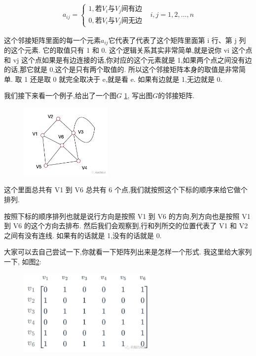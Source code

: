 \begin{align*}
a_{ij}=\begin{cases}1, \mbox{若}V_i\mbox{与}V_j\mbox{间有边} \\ 0, \mbox{若}V_i\mbox{与}V_j\mbox{间无边} \end{cases}
& i,j = 1, 2, ..., n
\end{align*}

这个邻接矩阵里面的每一个元素$a_{ij}$它代表了代表了这个矩阵里面第 i 行、第 j 列的这个元素. 它的取值只有 1 和 0. 这个逻辑关系其实非常简单,就是说你 vi 这个点和 vj 这个点如果是有边连接的话,你对应的这个元素就是 1,如果两个点之间没有边的话,那它就是 0,这个是只有两个取值的. 所以这个邻接矩阵本身的取值是非常简单. 取 1 还是取 0 就完全取决于 e,就是看 e. 如果有边就是 1,无边就是 0. 

我们接下来看一个例子,给出了一个图$G$ \ref{fig:img25_3}, 写出图$G$的邻接矩阵. 

\begin{figure}[ht]
  \centering
  \includegraphics[width=0.4\textwidth]{asset/20231227145100.png}
  \caption{}
  \label{fig:img25_3}
\end{figure}

这个里面总共有 V1 到 V6 总共有 6 个点,我们就按照这个下标的顺序来给它做个排列. 

按照下标的顺序排列也就是说行方向是按照 V1 到 V6 的方向,列方向也是按照 V1 到 V6 的这个方向去排布. 然后我们会观察到,行和列所交的位置代表了 V1 和 V2 之间有没有连线. 如果有的话就是 1,没有的话就是 0. 

大家可以去自己尝试一下,你就看一下矩阵列出来是怎样一个形式. 我这里给大家列一下, 如图\ref{fig:img25_4}: 

\begin{figure}[ht]
  \centering
  \includegraphics[width=0.6\textwidth]{asset/20231227145115.png}
  \caption{}
  \label{fig:img25_4}
\end{figure}

